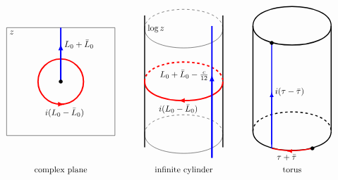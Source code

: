 \documentclass[12pt, a4paper]{article}
\theoremstyle{break}
\begin{document}
\begin{align*}
\renewcommand{\arraystretch}{1.3}
\renewcommand{\arraycolsep}{6mm}
\begin{array}{ccc}
 \begin{tikzpicture}[scale = .45, baseline=(current  bounding  box.center)]
  \draw (-5, -5) -- (5, -5) -- (5, 5) -- (-5, 5) node[below right]{$z$} -- cycle;
  \draw [red, ultra thick] (0, 0) circle (2.1);
  \draw [red, ultra thick, -latex] (.3, -2.1) -- (.35, -2.1) node[black, below] {$i(L_0-\bar{L}_0)$};
  \draw [blue, ultra thick] (0, 0) -- (0, 5);
  \draw [blue, ultra thick, -latex] (0, 0) -- (0, 3.5) node[black, right] {$L_0+\bar{L}_0$};
  \node[draw, circle, inner sep=1.5pt, fill] at (0, 0) {};
 \end{tikzpicture}
 & 
 \begin{tikzpicture}[xscale = .65, yscale = .55, baseline=(current  bounding  box.center)]
  \draw [very thick] (0, -5) -- (0, 5);
  \draw [very thick] (5, -5) -- (5, 5);
  \draw (0, -4) to [out = -90, in = -90] (5, -4);
  \draw [dashed] (0, -4) to [out = 90, in = 90] (5, -4);
  \draw (0, 4) node[right] {$\log z$} to [out = -90, in = -90] (5, 4);
  \draw [dashed] (0, 4) to [out = 90, in = 90] (5, 4);
  \draw [red, ultra thick] (0, 0) to [out = -90, in = -90] (5, 0);
  \draw [red, ultra thick, dashed] (0, 0) to [out = 90, in = 90] (5, 0);
  \draw [red, ultra thick, -latex] (2.2, -1.45) -- (2.15, -1.45) node[black, below] {$i(L_0-\bar{L}_0)$};
  \draw [blue, ultra thick] (4.3, -5.8) -- (4.3, 4.2);
  \draw [blue, ultra thick, -latex] (4.3, -5.8) -- (4.3, .5) node[black, left] {$L_0+\bar{L}_0-\frac{c}{12}$};
 \end{tikzpicture}
 & 
 \begin{tikzpicture}[xscale = .65, yscale = .55, baseline=(current  bounding  box.center)]
  \draw [very thick] (0, -4) -- (0, 4);
  \draw [very thick] (5, -4) -- (5, 4);
  \draw [very thick] (0, -4) to [out = -90, in = -90] (5, -4);
  \draw [very thick, dashed] (0, -4) to [out = 90, in = 90] (5, -4);
  \draw [very thick] (0, 4) to [out = -90, in = -90] (5, 4);
  \draw [very thick] (0, 4) to [out = 90, in = 90] (5, 4);
  \draw [red, very thick] (1.2, -5.3) to [out = -13, in = -167] (3.8, -5.3);
  \draw [red, very thick, -latex] (2.2, -5.5) -- (2.15, -5.5) node[black, below] {$\tau+\bar{\tau}$};
  \draw [blue, very thick] (1.2, -5.3) -- (1.2, 2.7);
  \draw [blue, very thick, -latex] (1.2, -5) -- (1.2, -1) node[black, right] {$i(\tau-\bar\tau)$};
  \node[draw, circle, inner sep=1.5pt, fill] at (3.8, -5.3) {};
  \node[draw, circle, inner sep=1.5pt, fill] at (1.2, 2.7) {};
 \end{tikzpicture}
 \\
 \text{complex plane}
 & 
 \text{infinite cylinder}
 &
 \text{torus}
 \end{array}
\end{align*}
\end{document}
